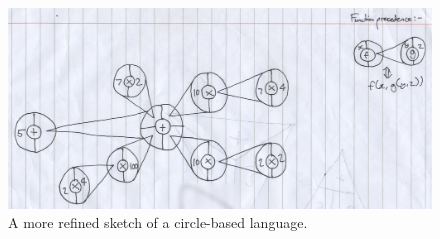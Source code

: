\documentclass[12pt,twoside,notitlepage,xetex]{report}
\begin{document}
\begin{center}
\begin{figure}[H]
\begin{center}
\includegraphics[width=\textwidth]{figs/mockups/sketches/21/21a.jpg}
\end{center}
\caption{A more refined sketch of a circle-based language.}
\label{fig:Circs2}
\end{figure}
\end{center}


\end{document}
